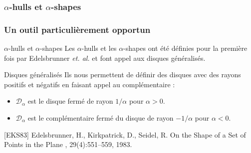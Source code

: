 \subsubsection{$\alpha$-hulls et $\alpha$-shapes}

\begin{frame}
\frametitle{Un outil particulièrement opportun}

\begin{block}{$\alpha$-hulls et $\alpha$-shapes}
  Les $\alpha$-hulls et les $\alpha$-shapes ont été définies pour la première fois par Edelsbrunner \emph{et. al.} et font appel aux disques généralisés.\\
\end{block}

\begin{block}{Disques généralisés }
  Ils nous permettent de définir des disques avec des rayons positifs et négatifs en faisant appel au complémentaire :

  \begin{itemize}
    \item $\mathcal{D}_{\alpha}$ est le disque fermé de rayon $1/\alpha$ pour $\alpha > 0$.
    \item $\mathcal{D}_{\alpha}$ est le complémentaire fermé du disque de rayon $- 1/\alpha$ pour $\alpha < 0$. 
  \end{itemize}
\end{block}

\scriptsize
\begin{thebibliography}{alpha}
  [EKS83] Edelsbrunner, H., Kirkpatrick, D., Seidel, R.
  \newblock On the Shape of a Set of Points in the Plane
  , 29(4):551--559, 1983.
\end{thebibliography}
\end{frame}


